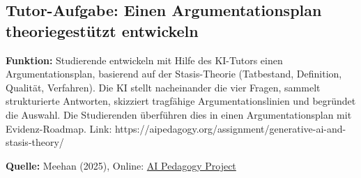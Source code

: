 \documentclass[
  ngerman,
  letterpaper,
  DIV=11]{scrreprt}
\begin{document}
\subsection{Tutor-Aufgabe: Einen Argumentationsplan theoriegestützt
entwickeln}\label{sec-prompt-argumentationsplan}

\textbf{Funktion:} Studierende entwickeln mit Hilfe des KI-Tutors einen
Argumentationsplan, basierend auf der Stasis-Theorie (Tatbestand,
Definition, Qualität, Verfahren). Die KI stellt nacheinander die vier
Fragen, sammelt strukturierte Antworten, skizziert tragfähige
Argumentationslinien und begründet die Auswahl. Die Studierenden
überführen dies in einen Argumentationsplan mit Evidenz-Roadmap. Link:
https://aipedagogy.org/assignment/generative-ai-and-stasis-theory/

\textbf{Quelle:} Meehan (2025), Online:
\href{https://aipedagogy.org/assignment/generative-ai-and-stasis-theory/}{AI
Pedagogy Project}
\end{document}
